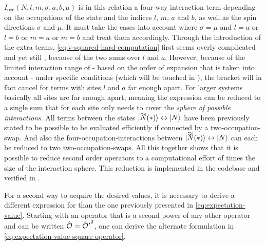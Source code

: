 $I_\text{occ}\left(N,l,m,\sigma,a,b,\mu\right)$ is in this relation a four-way interaction term depending on the occupations of the state \ketN and the indices $l$, $m$, $a$ and $b$, as well as the spin directions $\sigma$ and $\mu$. It must take the cases into account where $\sigma = \mu$ and $l=a$ or $l=b$ or $m=a$ or $m=b$ and treat them accordingly.
Through the introduction of the extra terms, \autoref{eq:v-squared-hard-computation} first seems overly complicated and yet still , because of the two sums over $l$ and $a$. 
However, because of the limited interaction range of \HeffOft[\ast] - based on the order of expansion that is taken into account - under specific conditions (which will be touched in ), the bracket will in fact cancel for terms with sites $l$ and $a$ far enough apart.
For larger systems basically all sites are \glqq far enough\grqq{} apart, meaning the expression can be reduced to a single sum  that for each site only needs to cover the \emph{sphere of possible interactions}.
All terms between the states $\ketN[\vphantom{N}\smash{\tilde{N}}(\ast)] \leftrightarrow \ketN$  have been previously stated to be possible to be evaluated efficiently if connected by a two-occupation-swap.
And also the four-occupation-interactions between $\ketN[\vphantom{N}\smash{\tildetilde{N}}(\ast)] \leftrightarrow \ketN$ can each be reduced to two two-occupation-swaps.
All this together shows that it is possible to reduce second order operators to a computational effort of  times the size of the interaction sphere. 
This reduction is implemented in the codebase and verified in .

For a second way to acquire the desired values, it is necessary to derive a different expression for  than the one previously presented in \autoref{eq:expectation-value}.
Starting with an operator that is a second power of any other operator and can be written $\hat{\text{$\mathcal{O}$}}^{ }_{} = {\hat{\text{$\mathcal{O}$}}^{ }_{}{}'}^2$, one can derive the alternate formulation in \autoref{eq:expectation-value-square-operator}.

